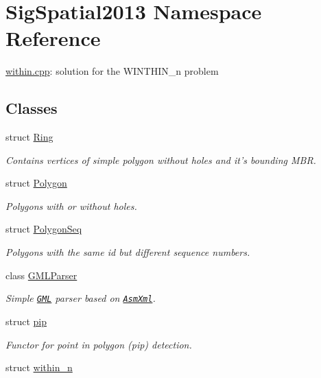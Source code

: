 \hypertarget{namespaceSigSpatial2013}{\section{Sig\-Spatial2013 Namespace Reference}
\label{namespaceSigSpatial2013}
}


\hyperlink{within_8cpp_source}{within.\-cpp}\-: solution for the W\-I\-N\-T\-H\-I\-N\-\_\-n problem  


\subsection*{Classes}
\begin{DoxyCompactItemize}
\item 
struct \hyperlink{structSigSpatial2013_1_1Ring}{Ring}
\begin{DoxyCompactList}\small\item\em Contains vertices of simple polygon without holes and it's bounding M\-B\-R. \end{DoxyCompactList}\item 
struct \hyperlink{structSigSpatial2013_1_1Polygon}{Polygon}
\begin{DoxyCompactList}\small\item\em Polygons with or without holes. \end{DoxyCompactList}\item 
struct \hyperlink{structSigSpatial2013_1_1PolygonSeq}{Polygon\-Seq}
\begin{DoxyCompactList}\small\item\em Polygons with the same id but different sequence numbers. \end{DoxyCompactList}\item 
class \hyperlink{classSigSpatial2013_1_1GMLParser}{G\-M\-L\-Parser}
\begin{DoxyCompactList}\small\item\em Simple \href{http://www.opengeospatial.org/standards/gml}{\tt G\-M\-L} parser based on \href{http://tibleiz.net/asm-xml/}{\tt Asm\-Xml}. \end{DoxyCompactList}\item 
struct \hyperlink{structSigSpatial2013_1_1pip}{pip}
\begin{DoxyCompactList}\small\item\em Functor for point in polygon (pip) detection. \end{DoxyCompactList}\item 
struct \hyperlink{structSigSpatial2013_1_1within__n}{within\-\_\-n}
\end{DoxyCompactItemize}

